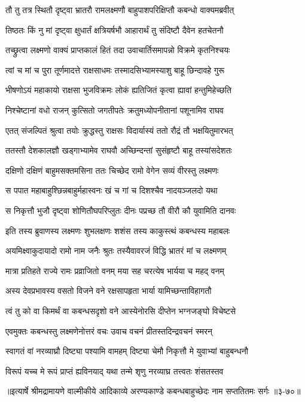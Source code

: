 
\twolineshloka
{तौ तु तत्र स्थितौ दृष्ट्वा भ्रातरौ रामलक्ष्मणौ}
{बाहुपाशपरिक्षिप्तौ कबन्धो वाक्यमब्रवीत्} %

\twolineshloka
{तिष्ठतः किं नु मां दृष्ट्वा क्षुधार्तं क्षत्रियर्षभौ}
{आहारार्थं तु संदिष्टौ दैवेन हतचेतनौ} %

\twolineshloka
{तच्छ्रुत्वा लक्ष्मणो वाक्यं प्राप्तकालं हितं तदा}
{उवाचार्तिसमापन्नो विक्रमे कृतनिश्चयः} %

\twolineshloka
{त्वां च मां च पुरा तूर्णमादत्ते राक्षसाधमः}
{तस्मादसिभ्यामस्याशु बाहू छिन्दावहे गुरू} %

\twolineshloka
{भीषणोऽयं महाकायो राक्षसा भुजविक्रमः}
{लोकं ह्यतिजितं कृत्वा ह्यावां हन्तुमिहेच्छति} %

\twolineshloka
{निश्चेष्टानां वधो राजन् कुत्सितो जगतीपतेः}
{क्रतुमध्योपनीतानां पशूनामिव राघव} %

\twolineshloka
{एतत् संजल्पितं श्रुत्वा तयोः क्रुद्धस्तु राक्षसः}
{विदार्यास्यं ततो रौद्रं तौ भक्षयितुमारभत्} %

\twolineshloka
{ततस्तौ देशकालज्ञौ खड्गाभ्यामेव राघवौ}
{अच्छिन्दन्तां सुसंहृष्टौ बाहू तस्यांसदेशतः} %

\twolineshloka
{दक्षिणो दक्षिणं बाहुमसक्तमसिना ततः}
{चिच्छेद रामो वेगेन सव्यं वीरस्तु लक्ष्मणः} %

\twolineshloka
{स पपात महाबाहुश्छिन्नबाहुर्महास्वनः}
{खं च गां च दिशश्चैव नादयञ्जलदो यथा} %

\twolineshloka
{स निकृत्तौ भुजौ दृष्ट्वा शोणितौघपरिप्लुतः}
{दीनः पप्रच्छ तौ वीरौ कौ युवामिति दानवः} %

\twolineshloka
{इति तस्य ब्रुवाणस्य लक्ष्मणः शुभलक्षणः}
{शशंस तस्य काकुस्त्थं कबन्धस्य महाबलः} %

\twolineshloka
{अयमिक्ष्वाकुदायादो रामो नाम जनैः श्रुतः}
{तस्यैवावरजं विद्धि भ्रातरं मां च लक्ष्मणम्} %

\twolineshloka
{मात्रा प्रतिहते राज्ये रामः प्रव्राजितो वनम्}
{मया सह चरत्येष भार्यया च महद् वनम्} %

\twolineshloka
{अस्य देवप्रभावस्य वसतो विजने वने}
{रक्षसापहृता भार्या यामिच्छन्ताविहागतौ} %

\twolineshloka
{त्वं तु को वा किमर्थं वा कबन्धसदृशो वने}
{आस्येनोरसि दीप्तेन भग्नजङ्घो विचेष्टसे} %

\twolineshloka
{एवमुक्तः कबन्धस्तु लक्ष्मणेनोत्तरं वचः}
{उवाच वचनं प्रीतस्तदिन्द्रवचनं स्मरन्} %

\twolineshloka
{स्वागतं वां नरव्याघ्रौ दिष्ट्या पश्यामि वामहम्}
{दिष्ट्या चेमौ निकृत्तौ मे युवाभ्यां बाहुबन्धनौ} %

\twolineshloka
{विरूपं यच्च मे रूपं प्राप्तं ह्यविनयाद् यथा}
{तन्मे शृणु नरव्याघ्र तत्त्वतः शंसतस्तव} %


॥इत्यार्षे श्रीमद्रामायणे वाल्मीकीये आदिकाव्ये अरण्यकाण्डे कबन्धबाहुच्छेदः नाम सप्ततितमः सर्गः ॥३-७०॥
